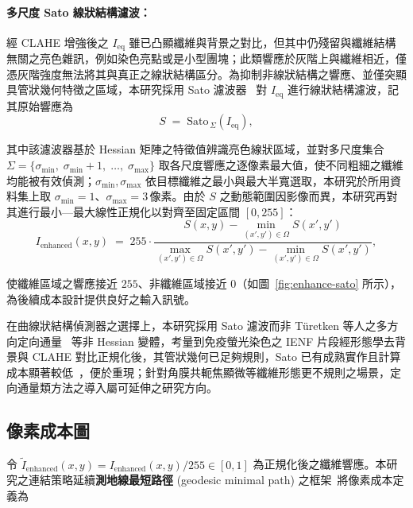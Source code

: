 \paragraph{多尺度 Sato 線狀結構濾波：} 經 CLAHE 增強後之 $I_{\text{eq}}$ 雖已凸顯纖維與背景之對比，但其中仍殘留與纖維結構無關之亮色雜訊，例如染色亮點或是小型團塊；此類響應於灰階上與纖維相近，僅憑灰階強度無法將其與真正之線狀結構區分。為抑制非線狀結構之響應、並僅突顯具管狀幾何特徵之區域，本研究採用 Sato 濾波器~\cite{sato1998three} 對 $I_{\text{eq}}$ 進行線狀結構濾波，記其原始響應為
\begin{equation}
  S \;=\; \mathrm{Sato}_{\,\Sigma}(I_{\text{eq}}),
  \label{eq:sato}
\end{equation}

\noindent 其中該濾波器基於 Hessian 矩陣之特徵值辨識亮色線狀區域，並對多尺度集合 $\Sigma = \{\sigma_{\min},\; \sigma_{\min}+1,\; \ldots,\; \sigma_{\max}\}$ 取各尺度響應之逐像素最大值，使不同粗細之纖維均能被有效偵測；$\sigma_{\min}, \sigma_{\max}$ 依目標纖維之最小與最大半寬選取，本研究於所用資料集上取 $\sigma_{\min} = 1$、$\sigma_{\max} = 3\,\text{像素}$。由於 $S$ 之動態範圍因影像而異，本研究再對其進行最小—最大線性正規化以對齊至固定區間 $[0, 255]$：
\begin{equation}
  I_{\text{enhanced}}(x, y) \;=\; 255 \cdot \frac{S(x, y) - \min_{(x', y') \in \Omega} S(x', y')}{\max_{(x', y') \in \Omega} S(x', y') - \min_{(x', y') \in \Omega} S(x', y')},
  \label{eq:sato-norm}
\end{equation}

\noindent 使纖維區域之響應接近 $255$、非纖維區域接近 $0$（如圖~\ref{fig:enhance-sato} 所示），為後續成本設計提供良好之輸入訊號。

在曲線狀結構偵測器之選擇上，本研究採用 Sato 濾波而非 Türetken 等人之多方向定向通量~\cite{turetken2013detecting} 等非 Hessian 變體，考量到免疫螢光染色之 IENF 片段經形態學去背景與 CLAHE 對比正規化後，其管狀幾何已足夠規則，Sato 已有成熟實作且計算成本顯著較低~\cite{vanderwalt2014scikit}，便於重現；針對角膜共軛焦顯微等纖維形態更不規則之場景，定向通量類方法之導入屬可延伸之研究方向。


\subsection{像素成本圖}
\label{subsec:cost}

令 $\tilde{I}_{\text{enhanced}}(x, y) = I_{\text{enhanced}}(x, y) / 255 \in [0, 1]$ 為正規化後之纖維響應。本研究之連結策略延續\textbf{測地線最短路徑} (geodesic minimal path) 之框架~\cite{cohen1997global, chen2019active}將像素成本定義為

